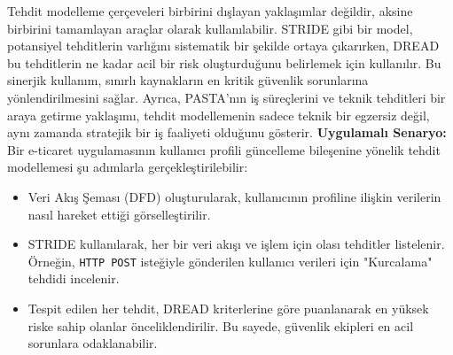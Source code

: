 Tehdit modelleme çerçeveleri birbirini dışlayan yaklaşımlar değildir, aksine birbirini tamamlayan araçlar olarak kullanılabilir. STRIDE gibi bir model, potansiyel tehditlerin varlığını sistematik bir şekilde ortaya çıkarırken, DREAD bu tehditlerin ne kadar acil bir risk oluşturduğunu belirlemek için kullanılır. Bu sinerjik kullanım, sınırlı kaynakların en kritik güvenlik sorunlarına yönlendirilmesini sağlar. Ayrıca, PASTA'nın iş süreçlerini ve teknik tehditleri bir araya getirme yaklaşımı, tehdit modellemenin sadece teknik bir egzersiz değil, aynı zamanda stratejik bir iş faaliyeti olduğunu gösterir.
\textbf{Uygulamalı Senaryo:}
Bir e-ticaret uygulamasının kullanıcı profili güncelleme bileşenine yönelik tehdit modellemesi şu adımlarla gerçekleştirilebilir:
\begin{itemize}
\item Veri Akış Şeması (DFD) oluşturularak, kullanıcının profiline ilişkin verilerin nasıl hareket ettiği görselleştirilir.
\item STRIDE kullanılarak, her bir veri akışı ve işlem için olası tehditler listelenir. Örneğin, \texttt{HTTP POST} isteğiyle gönderilen kullanıcı verileri için "Kurcalama" tehdidi incelenir.
\item Tespit edilen her tehdit, DREAD kriterlerine göre puanlanarak en yüksek riske sahip olanlar önceliklendirilir. Bu sayede, güvenlik ekipleri en acil sorunlara odaklanabilir.
\end{itemize}
